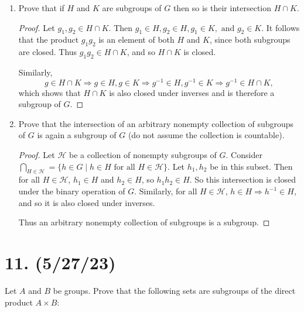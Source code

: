 \documentclass{article}
\begin{document}
\begin{enumerate}[label=(\alph*)]
    \item Prove that if $H$ and $K$ are subgroups of $G$ then so is their intersection $H \cap K$.
          \begin{proof}
            Let $g_1, g_2 \in H \cap K$. Then $g_1 \in H, g_2 \in H, g_1 \in K, \text{ and } g_2 \in K$. It follows that the product $g_1 g_2$ is an element of both $H$ and $K$, since both subgroups are closed. Thus $g_1 g_2 \in H \cap K$, and so $H \cap K$ is closed.

            Similarly, 
            \begin{equation*}
                g \in H \cap K \Rightarrow g \in H, g \in K \Rightarrow g^{-1} \in H, g^{-1} \in K \Rightarrow g^{-1} \in H \cap K,
            \end{equation*}
            which shows that $H \cap K$ is also closed under inverses and is therefore a subgroup of $G$.
          \end{proof}
    \item Prove that the intersection of an arbitrary nonempty collection of subgroups of $G$ is again a subgroup of $G$ (do not assume the collection is countable).
          \begin{proof}
            Let $\mathcal{H}$ be a collection of nonempty subgroups of $G$. Consider $\bigcap_{H \in \mathcal{H}} = \{ h \in G \mid h \in H \text{ for all } H \in \mathcal{H} \}$. Let $h_1, h_2$ be in this subset. Then for all $H \in \mathcal{H}$, $h_1 \in H$ and $h_2 \in H$, so $h_1 h_2 \in H$. So this intersection is closed under the binary operation of $G$. Similarly, for all $H \in \mathcal{H}$, $h \in H \Rightarrow h^{-1} \in H$, and so it is also closed under inverses.

            Thus an arbitrary nonempty collection of subgroups is a subgroup.
          \end{proof}
\end{enumerate}

\section*{11. (5/27/23)}

Let $A$ and $B$ be groups. Prove that the following sets are subgroups of the direct product $A \times B$:
\end{document}
